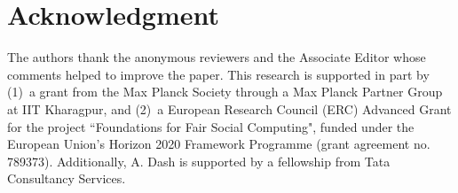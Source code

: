 \documentclass[lettersize,journal]{IEEEtran}
\begin{document}
	\section*{Acknowledgment}
	The authors thank the anonymous reviewers and the Associate Editor whose comments helped to improve the paper. This research is supported in part by (1)~a grant from the Max Planck Society through a Max Planck Partner Group at IIT Kharagpur, and (2)~a European Research Council (ERC) Advanced Grant for the project ``Foundations for Fair Social Computing", funded under the European Union's Horizon 2020 Framework Programme (grant agreement no. 789373). Additionally, A. Dash is supported by a fellowship from Tata Consultancy Services.
	
	\balance
	
	
\end{document}

